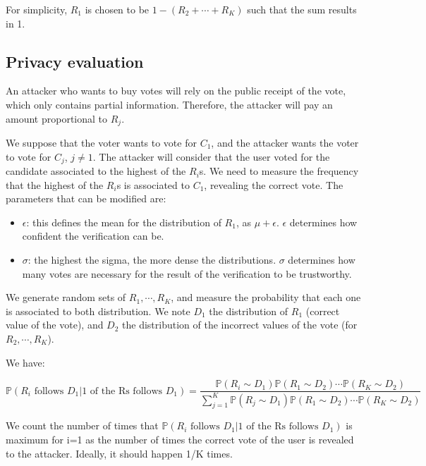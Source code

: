 \documentclass{article}
\begin{document}
For simplicity, $R_1$ is chosen to be $1-(R_2+\cdots+R_K)$ such that the sum results in 1.


\subsection{Privacy evaluation}

An attacker who wants to buy votes will rely on the public receipt of the vote, which only contains partial information. Therefore, the attacker will pay an amount proportional to $R_j$.

We suppose that the voter wants to vote for $C_1$, and the attacker wants the voter to vote for $C_j$, $j\neq 1$. The attacker will consider that the user voted for the candidate associated to the highest of the $R_i$s. We need to measure the frequency that the highest of the $R_i$s is associated to $C_1$, revealing the correct vote. The parameters that can be modified are:
\begin{itemize}
    \item $\epsilon$: this defines the mean for the distribution of $R_1$, as $\mu + \epsilon$. $\epsilon$ determines how confident the verification can be.
    \item $\sigma$: the highest the sigma, the more dense the distributions. $\sigma$ determines how many votes are necessary for the result of the verification to be trustworthy.
\end{itemize}

We generate random sets of $R_1, \cdots, R_K$, and measure the probability that each one is associated to both distribution. We note $D_1$ the distribution of $R_1$ (correct value of the vote), and $D_2$ the distribution of the incorrect values of the vote (for $R_2, \cdots, R_K$).

We have:

$\mathbb{P}(R_i\text{ follows }D_1 | \text{1 of the Rs follows }D_1)=\dfrac{\mathbb{P}(R_i\sim D_1)\mathbb{P}(R_1 \sim D_2)\cdots \mathbb{P}(R_K \sim D_2)}{\sum\limits_{j=1}^{K}\mathbb{P}(R_j\sim D_1)\mathbb{P}(R_1 \sim D_2)\cdots \mathbb{P}(R_K \sim D_2)}$

We count the number of times that $\mathbb{P}(R_i\text{ follows }D_1 | \text{1 of the Rs follows }D_1)$ is maximum for i=1 as the number of times the correct vote of the user is revealed to the attacker. Ideally, it should happen 1/K times.
\end{document}
